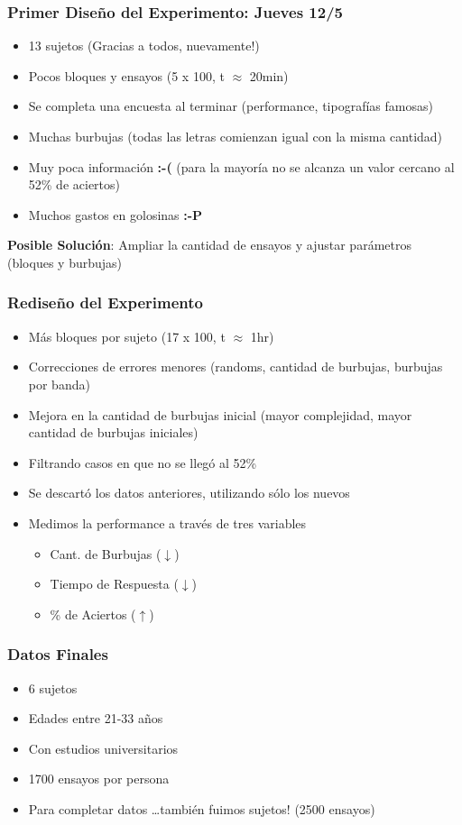 \documentclass[10pt]{beamer}
\begin{document}
	\begin{frame}
	\frametitle{Primer Diseño del Experimento: Jueves 12/5}
	    \begin{itemize}
		\item 13 sujetos (Gracias a todos, nuevamente!)
		\item Pocos bloques y ensayos (5 x 100, t $\approx$ 20min)
		\item Se completa una encuesta al terminar (performance, tipografías famosas)
		\item Muchas burbujas (todas las letras comienzan igual con la misma cantidad)
		\item Muy poca información {\bf:-(} (para la mayoría no se alcanza un valor cercano al 52\% de aciertos)\pause
		\item Muchos gastos en golosinas {\bf:-P}\pause
	    \end{itemize}
	\textbf{Posible Soluci\'on}: Ampliar la cantidad de ensayos y ajustar parámetros (bloques y burbujas)
	\end{frame}

	\begin{frame}
	\frametitle{Redise\~no del Experimento}
	    \begin{itemize}
		\item Más bloques por sujeto (17 x 100, t $\approx$ 1hr)
		\item Correcciones de errores menores (randoms, cantidad de burbujas, burbujas por banda)
		\item Mejora en la cantidad de burbujas inicial (mayor complejidad, mayor cantidad de burbujas iniciales)
		\item Filtrando casos en que no se llegó al 52\% \pause
		\item Se descartó los datos anteriores, utilizando sólo los nuevos
		\item Medimos la performance a través de tres variables
		\begin{itemize}
			\item Cant. de Burbujas ($\downarrow$)
			\item Tiempo de Respuesta ($\downarrow$)
			\item \% de Aciertos ($\uparrow$)
		\end{itemize}
    
	    \end{itemize}
	\end{frame}

	\begin{frame}
	\frametitle{Datos Finales}
	    \begin{itemize}
		\item 6 sujetos
		\item Edades entre 21-33 años
		\item Con estudios universitarios
		\item 1700 ensayos por persona\pause
		\item Para completar datos \ldots\pause también fuimos sujetos! (2500 ensayos)
	    \end{itemize}
	\end{frame}
\end{document}
